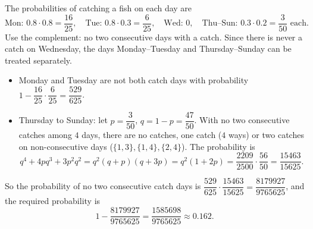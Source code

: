 The probabilities of catching a fish on each day are
\[\text{Mon: }0.8\cdot0.8=\dfrac{16}{25},\quad\text{Tue: }0.8\cdot0.3=\dfrac{6}{25},\quad\text{Wed: }0,\quad\text{Thu--Sun: }0.3\cdot0.2=\dfrac{3}{50}\text{ each}.\]
Use the complement: no two consecutive days with a catch. Since there is never a catch on Wednesday, the days Monday--Tuesday and Thursday--Sunday can be treated separately.
\begin{itemize}
\item Monday and Tuesday are not both catch days with probability $1-\dfrac{16}{25}\cdot\dfrac{6}{25}=\dfrac{529}{625}$.
\item Thursday to Sunday: let $p=\dfrac{3}{50}$, $q=1-p=\dfrac{47}{50}$. With no two consecutive catches among $4$ days, there are no catches, one catch ($4$ ways) or two catches on non-consecutive days ($\{1,3\},\{1,4\},\{2,4\}$). The probability is
\[q^4+4pq^3+3p^2q^2=q^2(q+p)(q+3p)=q^2(1+2p)=\dfrac{2209}{2500}\cdot\dfrac{56}{50}=\dfrac{15463}{15625}.\]
\end{itemize}
So the probability of no two consecutive catch days is $\dfrac{529}{625}\cdot\dfrac{15463}{15625}=\dfrac{8179927}{9765625}$, and the required probability is
\[1-\dfrac{8179927}{9765625}=\boxed{\dfrac{1585698}{9765625}}\approx0.162.\]
